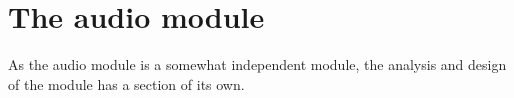 





 




\clearpage
\tableofcontents







	
	


\section{The audio module}
As the audio module is a somewhat independent module, the analysis and design
of the module has a section of its own.
 	
	
	
	
	
	
	


	
	
	














